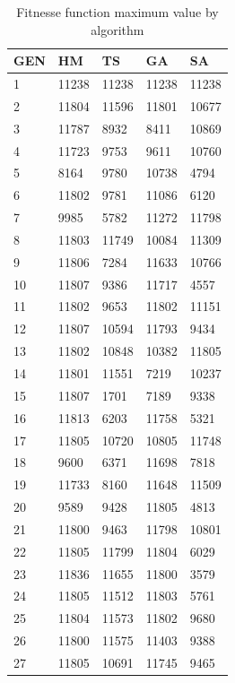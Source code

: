 \begin{table}[h]
\centering
\caption{Fitnesse function maximum value by algorithm}
\label{tab:averagefirst}
\begin{tabular}{|l|l|l|l|l|}
\hline
GEN & HM & TS  & GA    & SA    \\ \hline
1          & 11238 & 11238         & 11238 & 11238 \\ \hline
2          & 11804 & 11596         & 11801 & 10677 \\ \hline
3          & 11787 & 8932          & 8411  & 10869 \\ \hline
4          & 11723 & 9753          & 9611  & 10760 \\ \hline
5          & 8164  & 9780          & 10738 & 4794  \\ \hline
6          & 11802 & 9781          & 11086 & 6120  \\ \hline
7          & 9985  & 5782          & 11272 & 11798 \\ \hline
8          & 11803 & 11749         & 10084 & 11309 \\ \hline
9          & 11806 & 7284          & 11633 & 10766 \\ \hline
10         & 11807 & 9386          & 11717 & 4557  \\ \hline
11         & 11802 & 9653          & 11802 & 11151 \\ \hline
12         & 11807 & 10594         & 11793 & 9434  \\ \hline
13         & 11802 & 10848         & 10382 & 11805 \\ \hline
14         & 11801 & 11551         & 7219  & 10237 \\ \hline
15         & 11807 & 1701          & 7189  & 9338  \\ \hline
16         & 11813 & 6203          & 11758 & 5321  \\ \hline
17         & 11805 & 10720         & 10805 & 11748 \\ \hline
18         & 9600  & 6371          & 11698 & 7818  \\ \hline
19         & 11733 & 8160          & 11648 & 11509 \\ \hline
20         & 9589  & 9428          & 11805 & 4813  \\ \hline
21         & 11800 & 9463          & 11798 & 10801 \\ \hline
22         & 11805 & 11799         & 11804 & 6029  \\ \hline
23         & 11836 & 11655         & 11800 & 3579  \\ \hline
24         & 11805 & 11512         & 11803 & 5761  \\ \hline
25         & 11804 & 11573         & 11802 & 9680  \\ \hline
26         & 11800 & 11575         & 11403 & 9388  \\ \hline
27         & 11805 & 10691         & 11745 & 9465  \\ \hline
\end{tabular}
\end{table}

